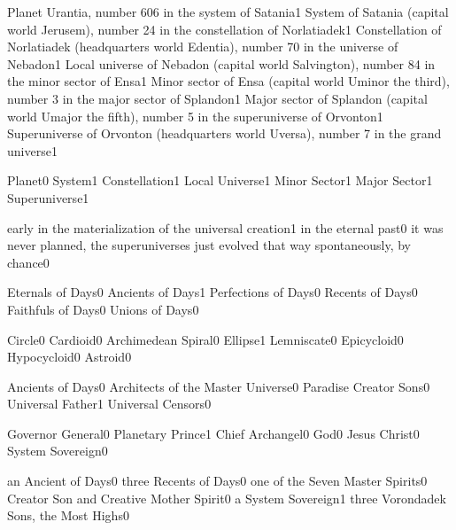 {Planet Urantia, number 606 in the system of Satania}{1}
{System of Satania (capital world Jerusem), number 24 in the constellation of Norlatiadek}{1}
{Constellation of Norlatiadek (headquarters world Edentia), number 70 in the universe of Nebadon}{1}
{Local universe of Nebadon (capital world Salvington), number 84 in the minor sector of Ensa}{1}
{Minor sector of Ensa (capital world Uminor the third), number 3 in the major sector of Splandon}{1}
{Major sector of Splandon (capital world Umajor the fifth), number 5 in the superuniverse of Orvonton}{1}
{Superuniverse of Orvonton (headquarters world Uversa), number 7 in the grand universe}{1}
\qstop

{Planet}{0}
{System}{1}
{Constellation}{1}
{Local Universe}{1}
{Minor Sector}{1}
{Major Sector}{1}
{Superuniverse}{1}
\qstop

{early in the materialization of the universal creation}{1}
{in the eternal past}{0}
{it was never planned, the superuniverses just evolved that way spontaneously, by chance}{0}
\qstop

{Eternals of Days}{0}
{Ancients of Days}{1}
{Perfections of Days}{0}
{Recents of Days}{0}
{Faithfuls of Days}{0}
{Unions of Days}{0}
\qstop

{Circle}{0}
{Cardioid}{0}
{Archimedean Spiral}{0}
{Ellipse}{1}
{Lemniscate}{0}
{Epicycloid}{0}
{Hypocycloid}{0}
{Astroid}{0}
\qstop

{Ancients of Days}{0}
{Architects of the Master Universe}{0}
{Paradise Creator Sons}{0}
{Universal Father}{1}
{Universal Censors}{0}
\qstop

{Governor General}{0}
{Planetary Prince}{1}
{Chief Archangel}{0}
{God}{0}
{Jesus Christ}{0}
{System Sovereign}{0}
\qstop

{an Ancient of Days}{0}
{three Recents of Days}{0}
{one of the Seven Master Spirits}{0}
{Creator Son and Creative Mother Spirit}{0}
{a System Sovereign}{1}
{three Vorondadek Sons, the Most Highs}{0}
\qstop

